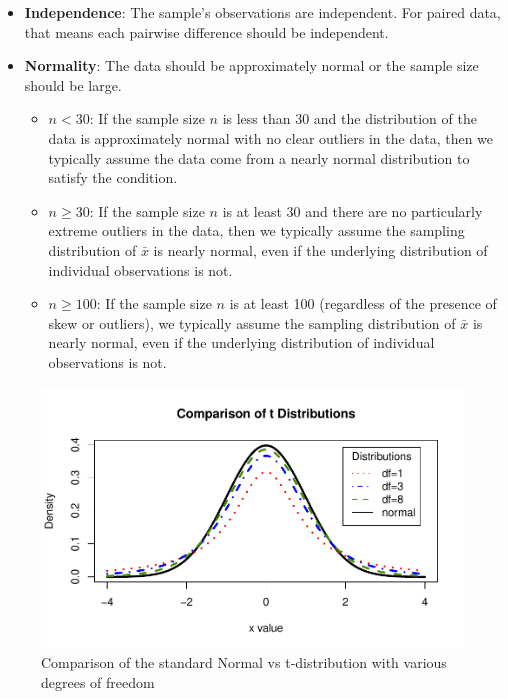 \documentclass[
]{report}
\begin{document}
\begin{itemize}
\item
  \textbf{Independence}: The sample's observations are independent. For paired data, that means each pairwise difference should be independent.
\item
  \textbf{Normality}: The data should be approximately normal or the sample size should be large.

  \begin{itemize}
  \item
    \(n < 30\): If the sample size \(n\) is less than 30 and the distribution of the data is approximately normal with no clear outliers in the data, then we typically assume the data come from a nearly normal distribution to satisfy the condition.
  \item
    \(n \geq 30\): If the sample size \(n\) is at least 30 and there are no particularly extreme outliers in the data, then we typically assume the sampling distribution of \(\bar{x}\) is nearly normal, even if the underlying distribution of individual observations is not.
  \item
    \(n \geq 100\): If the sample size \(n\) is at least 100 (regardless of the presence of skew or outliers), we typically assume the sampling distribution of \(\bar{x}\) is nearly normal, even if the underlying distribution of individual observations is not.
  \end{itemize}
\end{itemize}

\begin{figure}

{\centering \includegraphics[width=0.7\linewidth]{11-OCA08-paired-theory_files/figure-latex/tdist-1} 

}

\caption{Comparison of the standard Normal vs t-distribution with various degrees of freedom}\label{fig:tdist}
\end{figure}
\end{document}
